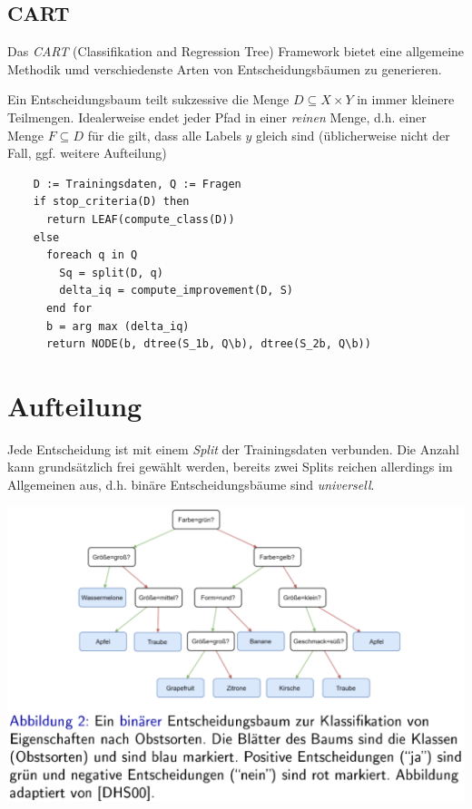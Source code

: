 \documentclass{report}
\begin{document}
  \subsection{CART}	
  
  Das \textit{CART} (Classifikation and Regression Tree) Framework bietet eine allgemeine Methodik umd	
  verschiedenste Arten von Entscheidungsbäumen zu generieren.\par	
  Ein Entscheidungsbaum teilt sukzessive die Menge $D \subseteq X \times Y$ in immer kleinere Teilmengen.	
  Idealerweise endet jeder Pfad in einer \textit{reinen} Menge, d.h. einer Menge $F \subseteq D$ für die gilt,	
  dass alle Labels $y$ gleich sind (üblicherweise nicht der Fall, ggf. weitere Aufteilung)	
  
  \begin{lstlisting}	
    D := Trainingsdaten, Q := Fragen	
    if stop_criteria(D) then	
      return LEAF(compute_class(D))	
    else	
      foreach q in Q	
        Sq = split(D, q)	
        delta_iq = compute_improvement(D, S)	
      end for	
      b = arg max (delta_iq)	
      return NODE(b, dtree(S_1b, Q\b), dtree(S_2b, Q\b))	
  \end{lstlisting}	
  
  \section{Aufteilung}	
  
  Jede Entscheidung ist mit einem \textit{Split} der Trainingsdaten verbunden. Die Anzahl kann grundsätzlich frei	
  gewählt werden, bereits zwei Splits reichen allerdings im Allgemeinen aus, d.h. binäre Entscheidungsbäume sind \textit{universell}.	
  
  \begin{center}	
    \includegraphics[scale=.325]{ml07_2}	
  \end{center}	
  
\end{document}
